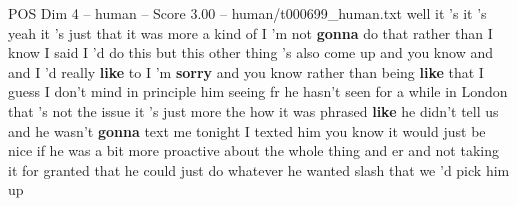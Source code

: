 \begin{textsample}{POS Dim 4 – human – Score 3.00 – human/t000699\_human.txt}  \label{ex:f4_pos_011}
well it 's it 's yeah it 's just that it was more a kind of I 'm not \textbf{gonna} do that rather than I know I said I 'd do this but this other thing 's also come up and you know and and I 'd really \textbf{like} to I 'm \textbf{sorry} and you know rather than being \textbf{like} that I guess I don't mind in principle him seeing fr he hasn't seen for a while in London that 's not the issue it 's just more the how it was phrased \textbf{like} he didn't tell us and he wasn't \textbf{gonna} text me tonight I texted him you know it would just be nice if he was a bit more proactive about the whole thing and er and not taking it for granted that he could just do whatever he wanted slash that we 'd pick him up

\end{textsample}
